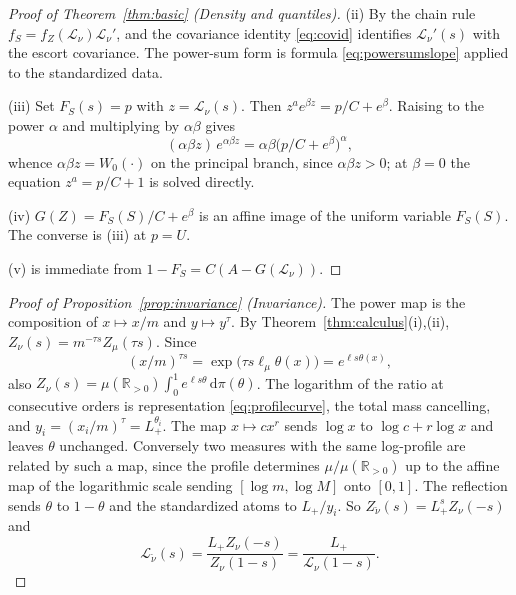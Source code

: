 \documentclass[sn-mathphys-num]{sn-jnl}\newcommand{\SNJNL}{}
\theoremstyle{thmstyleone}
\theoremstyle{thmstyletwo}
\theoremstyle{thmstylethree}
\theoremstyle{thmstyleone}
\providecommand{\Rpos}{\mathbb{R}_{>0}}
\providecommand{\Leh}{\mathscr{L}}
\providecommand{\dd}{\,\mathrm{d}}
\begin{document}
\begin{appendices}
\begin{proof}[Proof of Theorem~\ref{thm:basic} (Density and quantiles)]
			\noindent(ii) By the chain rule
			$f_S=f_Z(\Leh_\nu)\Leh_\nu'$, and the covariance identity \eqref{eq:covid} identifies
			$\Leh_\nu'(s)$ with the escort covariance. The power-sum form is
			formula \eqref{eq:powersumslope} applied to the standardized data.
			
			\noindent(iii) Set
			$F_S(s)=p$ with $z=\Leh_\nu(s)$. Then $z^{a}e^{\beta z}=p/C+e^{\beta}$.
			Raising to the power $\alpha$ and multiplying by $\alpha\beta$
			gives
			\begin{equation}\label{eq:quantilesolve}
				(\alpha\beta z)\,e^{\alpha\beta z}=\alpha\beta\bigl(p/C+e^{\beta}\bigr)^{\alpha},
			\end{equation}
			whence $\alpha\beta z=W_0(\cdot)$ on the principal branch, since
			$\alpha\beta z>0$; at $\beta=0$ the equation $z^{a}=p/C+1$ is solved
			directly.
			
			\noindent(iv) $G(Z)=F_S(S)/C+e^{\beta}$ is an affine image
			of the uniform variable $F_S(S)$. The converse is (iii) at $p=U$.
			
			\noindent(v) is immediate from $1-F_S=C(A-G(\Leh_\nu))$.
		\end{proof}
		
		\begin{proof}[Proof of Proposition~\ref{prop:invariance} (Invariance)]
			The power map is the composition of $x\mapsto x/m$ and
			$y\mapsto y^{\tau}$. By Theorem~\ref{thm:calculus}(i),(ii),
			$Z_\nu(s)=m^{-\tau s}Z_\mu(\tau s)$. Since
			\begin{equation}\label{eq:thetaexp}
				(x/m)^{\tau s}=\exp\bigl(\tau s\ell_\mu\theta(x)\bigr)=e^{\ell s\theta(x)},
			\end{equation}
			also $Z_\nu(s)=\mu(\Rpos)\int_0^1e^{\ell s\theta}\dd\pi(\theta)$.
			The logarithm of the ratio at consecutive orders is
			representation \eqref{eq:profilecurve}, the total mass cancelling, and
			$y_i=(x_i/m)^{\tau}=L_+^{\theta_i}$. The map $x\mapsto cx^{r}$ sends
			$\log x$ to $\log c+r\log x$ and leaves $\theta$ unchanged.
			Conversely two measures with the same log-profile are related by
			such a map, since the profile determines $\mu/\mu(\Rpos)$ up to the
			affine map of the logarithmic scale sending $[\log m,\log M]$ onto
			$[0,1]$. The reflection sends $\theta$ to $1-\theta$ and the
			standardized atoms to $L_+/y_i$. So $Z_{\check\nu}(s)=L_+^{s}Z_\nu(-s)$
			and
			\begin{equation}\label{eq:reflectionproof}
				\Leh_{\check\nu}(s)=\frac{L_+Z_\nu(-s)}{Z_\nu(1-s)}=\frac{L_+}{\Leh_\nu(1-s)} .
			\end{equation}
		\end{proof}
		

\end{appendices}
\end{document}
